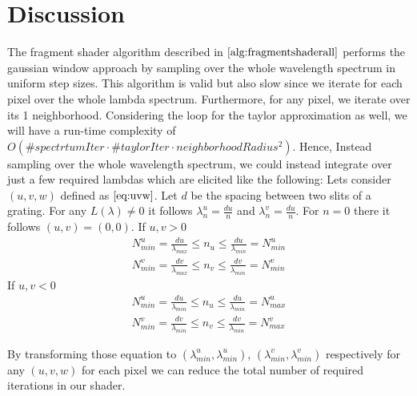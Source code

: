 \section{Discussion}
\label{sec:impldiscus}
The fragment shader algorithm described in $\ref{alg:fragmentshaderall}$ performs the gaussian window approach by sampling over the whole wavelength spectrum in uniform step sizes. This algorithm is valid but also slow since we iterate for each pixel over the whole lambda spectrum. Furthermore, for any pixel, we iterate over its 1 neighborhood. Considering the loop for the taylor approximation as well, we will have a run-time complexity of $O(\#spectrtumIter \cdot \#taylorIter \cdot neighborhoodRadius^2)$. 
Hence, Instead sampling over the whole wavelength spectrum, we could instead integrate over just a few required lambdas which are elicited like the following: Lets consider $(u,v,w)$ defined as $\ref{eq:uvw}$. Let $d$ be the spacing between two slits of a grating. For any $L(\lambda) \neq 0$ it follows $\lambda_{n}^{u} = \frac{d u}{n}$ and $\lambda_{n}^{v} = \frac{d u}{n}$. For $n = 0$ there it follows $(u,v)=(0,0)$. 
If $u,v > 0$
\begin{align*}
    N_{min}^{u} = \frac{d u}{\lambda_{max}} \leq n_{u} \leq \frac{d u}{\lambda_{min}} = N_{min}^{u}\\
    N_{min}^{v} = \frac{d v}{\lambda_{max}} \leq n_{v} \leq \frac{d v}{\lambda_{min}} = N_{min}^{v}
\end{align*}
If $u,v < 0$
\begin{align*}
    N_{min}^{u} = \frac{d u}{\lambda_{min}} \leq n_{u} \leq \frac{d u}{\lambda_{min}} = N_{max}^{u}\\
    N_{min}^{v} = \frac{d v}{\lambda_{min}} \leq n_{v} \leq \frac{d v}{\lambda_{min}} = N_{max}^{v}
\end{align*}

By transforming those equation to $(\lambda_{min}^{u}, \lambda_{min}^{u})$, $(\lambda_{min}^{v}, \lambda_{min}^{v})$ respectively for any $(u,v,w)$ for each pixel we can reduce the total number of required iterations in our shader.  


